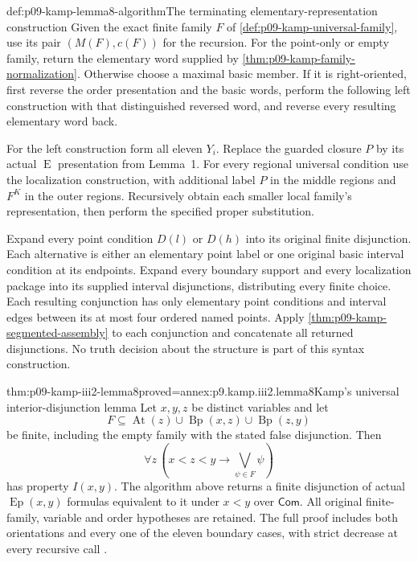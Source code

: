 \begin{hbmethod}{def:p09-kamp-lemma8-algorithm}{The terminating elementary-representation construction}
Given the exact finite family \(F\) of
\cref{def:p09-kamp-universal-family}, use its pair
\((M(F),c(F))\) for the recursion. For the point-only or empty
family, return the elementary word supplied by
\cref{thm:p09-kamp-family-normalization}. Otherwise choose a maximal
basic member. If it is right-oriented, first reverse the order
presentation and the basic words, perform the following left construction
with that distinguished reversed word, and reverse every resulting
elementary word back.

For the left construction form all eleven \(Y_i\). Replace the
guarded closure \(P\) by its actual \(\operatorname{E}\)
presentation from Lemma~1. For every regional universal condition
use the localization construction, with additional label \(P\)
in the middle regions and \(F^K\) in the outer regions. Recursively
obtain each smaller local family's representation, then perform the
specified proper substitution.

Expand every point condition \(D(l)\) or \(D(h)\) into its
original finite disjunction. Each alternative is either an elementary
point label or one original basic interval condition at its endpoints.
Expand every boundary support and every localization package into its
supplied interval disjunctions, distributing every finite choice.
Each resulting conjunction has only elementary point conditions and
interval edges between its at most four ordered named points.
Apply \cref{thm:p09-kamp-segmented-assembly} to each conjunction
and concatenate all returned disjunctions. No truth decision about the
structure is part of this syntax construction.
\end{hbmethod}

\begin{hblemma}{thm:p09-kamp-iii2-lemma8}{proved=annex:p9.kamp.iii2.lemma8}{Kamp's universal interior-disjunction lemma}
Let \(x,y,z\) be distinct variables and let
\[
 F\subseteq\operatorname{At}(z)\cup\operatorname{Bp}(x,z)
                                      \cup\operatorname{Bp}(z,y)
\]
be finite, including the empty family with the stated false disjunction.
Then
\[
                   \forall z\,(x<z<y\to\bigvee_{\psi\in F}\psi)
\]
has property \(I(x,y)\). The algorithm above returns a finite
disjunction of actual \(\operatorname{Ep}(x,y)\) formulas
equivalent to it under \(x<y\) over \(\mathsf{Com}\).
All original finite-family, variable and order hypotheses are retained.
The full proof includes both orientations and every one of the eleven
boundary cases, with strict decrease at every recursive call
\cite[ch.~III, lemma~8, pp.~83--92]{Kamp1968}.
\end{hblemma}

